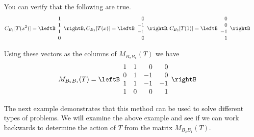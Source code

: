 \begin{solution}
You can verify that the following are true.
\[
C_{B_2}[T(x^2)] = \leftB \begin{array}{r} 
1 \\
1 \\
1 \\
0
\end{array} \rightB,  C_{B_2}[T(x)] = \leftB \begin{array}{r} 
0 \\
-1 \\
-1 \\
0
\end{array} \rightB,  C_{B_2}[T(1)] = \leftB \begin{array}{r} 
0 \\
0 \\
-1 \\
1
\end{array} \rightB
\]

Using these vectors as the columns of $M_{B_2B_1}(T)$ we have
\[
M_{B_2B_1}(T) = \leftB \begin{array}{rrrr}
1 & 1 & 0 & 0 \\
0 & 1 & -1 & 0 \\
1 & 1 & -1 & -1 \\
1 & 0 & 0 & 1 
\end{array} \rightB
\]
\end{solution}

The next example demonstrates that this method can be used to solve different types of problems. We will examine the above example and see if we can work backwards to determine the action of $T$ from the matrix $M_{B_2B_1}(T)$.

